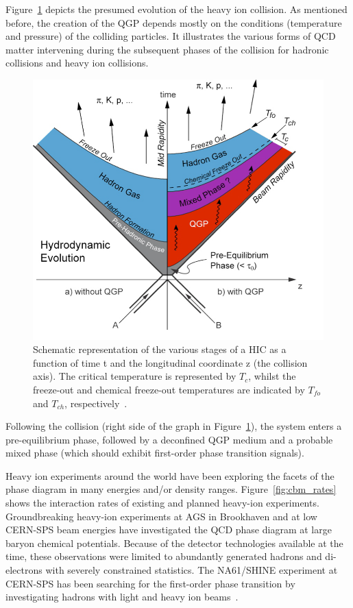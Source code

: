Figure~\ref{fig_heavyion} depicts the presumed evolution of the heavy ion collision. As mentioned before, the creation of the \gls{QGP} depends mostly on the conditions (temperature and pressure) of the colliding particles. It illustrates the various forms of QCD matter intervening during the subsequent phases of the collision for hadronic collisions and heavy ion collisions.
\begin{figure}[!h]
\centering
 \includegraphics[width=0.6\columnwidth]{Chapter1/images/heavyion.png}
\caption{Schematic representation of the various stages of a HIC as a function of time t and the longitudinal coordinate z (the collision axis). The critical temperature is represented by $T_c$, whilst the freeze-out and chemical freeze-out temperatures are indicated by $T_{fo}$ and $T_{ch}$, respectively~\cite{Sahoo:2745520}.}
\label{fig_heavyion}
\end{figure}

 Following the collision (right side of the graph in Figure~\ref{fig_heavyion}), the system enters a pre-equilibrium phase, followed by a deconfined QGP medium and a probable mixed phase (which should exhibit first-order phase transition signals).

Heavy ion experiments around the world have been exploring the facets of the phase diagram in many energies and/or density ranges. Figure~\ref{fig:cbm_rates} shows the interaction rates of existing and planned heavy-ion experiments. Groundbreaking heavy-ion experiments at AGS in Brookhaven and at low CERN-SPS beam energies have investigated the QCD phase diagram at large baryon chemical potentials. Because of the detector technologies available at the time, these observations were limited to abundantly generated hadrons and di-electrons with severely constrained statistics. The NA61/SHINE experiment at CERN-SPS has been searching for the first-order phase transition by investigating hadrons with light and heavy ion beams~\cite{CBM_physics, Turko:2301677}.

